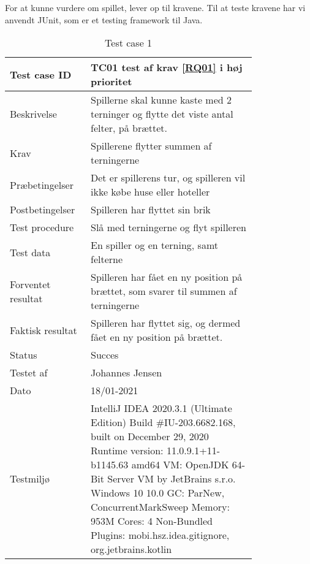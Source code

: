 For at kunne vurdere om spillet, lever op til kravene. Til at teste kravene har vi anvendt JUnit, som er et testing framework til Java. 

\begin{table}[h]
    \centering
    \begin{tabular}{|p{0.20\linewidth} | p{0.6\linewidth}|}
    \hline
        Test case ID & TC01 test af krav \ref{RQ01} i høj prioritet\\
        \hline
        Beskrivelse & Spillerne skal kunne kaste med 2 terninger og flytte det viste antal felter, på brættet. \\
        \hline
        Krav & Spillerene flytter summen af terningerne\\
        \hline
        Præbetingelser & Det er spillerens tur, og spilleren vil ikke købe huse eller hoteller \\
        \hline
        Postbetingelser & Spilleren har flyttet sin brik \\
        \hline
        Test procedure & Slå med terningerne og flyt spilleren\\
        \hline
        Test data & En spiller og en terning, samt felterne \\
        \hline
        Forventet resultat & Spilleren har fået en ny position på brættet, som svarer til summen af terningerne \\
        \hline
        Faktisk resultat & Spilleren har flyttet sig, og dermed fået en ny position på brættet. \\
        \hline
        Status & Succes\\
        \hline
        Testet af & Johannes Jensen \\
        \hline
        Dato & 18/01-2021 \\
        \hline
        Testmiljø & IntelliJ IDEA 2020.3.1 (Ultimate Edition)
Build \#IU-203.6682.168, built on December 29, 2020
Runtime version: 11.0.9.1+11-b1145.63 amd64
VM: OpenJDK 64-Bit Server VM by JetBrains s.r.o.
Windows 10 10.0
GC: ParNew, ConcurrentMarkSweep
Memory: 953M
Cores: 4
Non-Bundled Plugins: mobi.hsz.idea.gitignore, org.jetbrains.kotlin
        \\\hline
    \end{tabular}
    \caption{Test case 1}
    \label{tab:TC01}
\end{table}

\newpage


